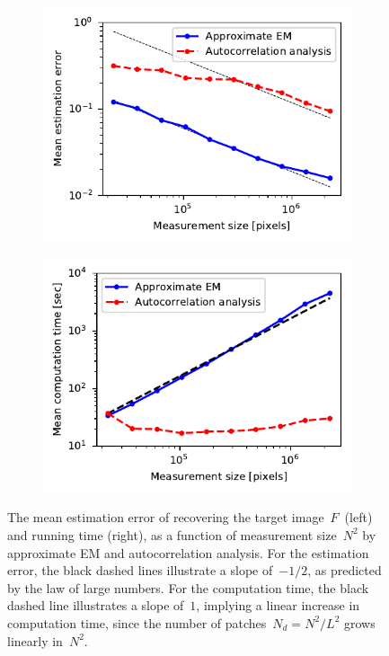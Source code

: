 \documentclass{article}
\begin{document}
\begin{figure}[!tb]
	\begin{subfigure}[ht]{.5\columnwidth}
		\centering
		\includegraphics[width=1\columnwidth]{figures/experiment_size_err.pdf}
	\end{subfigure}
	\begin{subfigure}[ht]{.5\columnwidth}
		\centering
		\includegraphics[width=1\columnwidth]{figures/experiment_size_time.pdf}
	\end{subfigure}
	\caption{The mean estimation error of recovering the target image~$F$~(left) and running time (right), as a function of measurement size~$N^2$ by approximate EM and autocorrelation analysis. For the estimation error, the black dashed lines illustrate a slope of~$-1/2$, as predicted by the law of large numbers. For the computation time, the black dashed line illustrates a slope of~$1$, implying a linear increase in computation time, since the number of patches~\mbox{$N_d = N^2 / L^2$} grows linearly in~$N^2$.}
\label{fig:size_experiment}
\end{figure}
\end{document}
